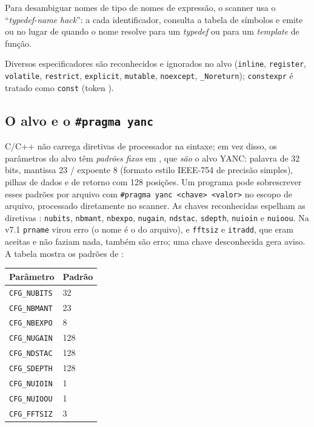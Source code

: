 Para desambiguar nomes de tipo de nomes de expressão, o scanner usa o
\enquote{\emph{typedef-name hack}}: a cada identificador, consulta a tabela de
símbolos e emite  ou  no lugar de
 quando o nome resolve para um \emph{typedef} ou para um
\emph{template} de função.

Diversos especificadores são reconhecidos e ignorados no alvo
(\lstinline|inline|, \lstinline|register|, \lstinline|volatile|,
\lstinline|restrict|, \lstinline|explicit|, \lstinline|mutable|,
\lstinline|noexcept|, \lstinline|_Noreturn|); \lstinline|constexpr| é
tratado como \lstinline|const| (token ).

\subsection{O alvo e o \texttt{\#pragma yanc}}

C/C++ não carrega diretivas de processador na sintaxe; em vez disso, os
parâmetros do alvo têm \emph{padrões fixos} em , que
\emph{são} o alvo YANC: palavra de 32 bits, mantissa 23 / expoente 8 (formato
estilo IEEE-754 de precisão simples), pilhas de dados e de retorno com 128
posições. Um programa pode sobrescrever esses padrões por arquivo com
\lstinline|#pragma yanc <chave> <valor>| no escopo de arquivo, processado
diretamente no scanner. As chaves reconhecidas espelham as diretivas \cmm{}:
\lstinline|nubits|, \lstinline|nbmant|, \lstinline|nbexpo|, \lstinline|nugain|,
\lstinline|ndstac|, \lstinline|sdepth|, \lstinline|nuioin| e \lstinline|nuioou|.
Na v7.1 \lstinline|prname| virou erro (o nome é o do arquivo), e \lstinline|fftsiz|
e \lstinline|itradd|, que eram aceitas e não faziam nada, também são erro; uma
chave desconhecida gera aviso. A tabela mostra os padrões de :

\begin{tabularx}{\linewidth}{Y Y}
\toprule
\textbf{Parâmetro} & \textbf{Padrão} \\
\midrule
\lstinline|CFG_NUBITS| & 32 \\
\lstinline|CFG_NBMANT| & 23 \\
\lstinline|CFG_NBEXPO| & 8 \\
\lstinline|CFG_NUGAIN| & 128 \\
\lstinline|CFG_NDSTAC| & 128 \\
\lstinline|CFG_SDEPTH| & 128 \\
\lstinline|CFG_NUIOIN| & 1 \\
\lstinline|CFG_NUIOOU| & 1 \\
\lstinline|CFG_FFTSIZ| & 3 \\
\bottomrule
\end{tabularx}

